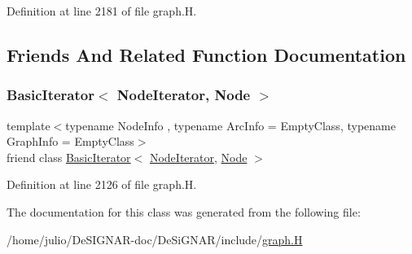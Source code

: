 Definition at line 2181 of file graph.\+H.



\subsection{Friends And Related Function Documentation}
\mbox{\label{class_designar_1_1_digraph_1_1_node_iterator_a21dc6ae614d097ff896e9e8e422d8f3c}} 
\subsubsection{\texorpdfstring{Basic\+Iterator$<$ Node\+Iterator, Node $>$}{BasicIterator< NodeIterator, Node >}}
{\footnotesize\ttfamily template$<$typename Node\+Info , typename Arc\+Info  = Empty\+Class, typename Graph\+Info  = Empty\+Class$>$ \\
friend class \hyperlink{class_designar_1_1_basic_iterator}{Basic\+Iterator}$<$ \hyperlink{class_designar_1_1_digraph_1_1_node_iterator}{Node\+Iterator}, \hyperlink{class_designar_1_1_digraph_a4dc921c41a480b7946a04170e997d8ae}{Node} $>$\hspace{0.3cm}{\ttfamily [friend]}}



Definition at line 2126 of file graph.\+H.



The documentation for this class was generated from the following file\+:\begin{DoxyCompactItemize}
\item 
/home/julio/\+De\+S\+I\+G\+N\+A\+R-\/doc/\+De\+Si\+G\+N\+A\+R/include/\hyperlink{graph_8_h}{graph.\+H}\end{DoxyCompactItemize}
